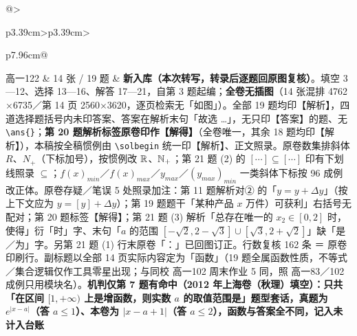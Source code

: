 \documentclass[a4paper,11pt]{article}
\begin{document}
\begin{xltabular}{\textwidth}{@{}>{\raggedright\arraybackslash}p{3.39cm}>{\centering\arraybackslash}p{3.39cm}>{\raggedright\arraybackslash}p{7.96cm}@{}}
高一122 & 14 张 / 19 题 & \textbf{新入库（本次转写，转录后逐题回原图复核）}。填空 3---12、选择 13---16、解答 17---21，自第 3 题起编；\textbf{全卷无插图}（14 张混排 4762$\times$6735／第 14 页 2560$\times$3620，逐页检索无「如图」）。全部 19 题均印【解析】，四道选择题括号内未印答案、答案在解析末句「故选 \ldots」，无只印【答案】的题、无 \texttt{\textbackslash{}ans\{\}}；\textbf{第 20 题解析标签原卷印作【解得】}（全卷唯一，其余 18 题均印【解析】），本稿按全稿惯例由 \texttt{\textbackslash{}solbegin} 统一印【解析】、正文照录。原卷数集排斜体 \(R\)、\(N_+\allowbreak \)（下标加号），按惯例改 \(\mathbb{R}\)、\(\mathbb{N}_+\allowbreak \)；第 21 题 (2) 的 \(\left[\cdots\right]\subseteq\allowbreak \left[\cdots\right]\) 印有下划线照录 \(\subseteq\allowbreak \)；\(f(x)_{min}\)／\(f(x)_{max}\)／\(y_{max}\)／\((y_{max})_{min}\) 一类斜体下标按 96 成例改正体。原卷存疑／笔误 5 处照录加注：第 11 题解析对② 的「\(y=y+\allowbreak \Delta y\)」（按上下文应为 \(y=\allowbreak [y]+\allowbreak \Delta y\)）；第 19 题题干「某种产品 \(x\) 万件）可获利」右括号无配对；第 20 题标签【解得】；第 21 题 (3) 解析「总存在唯一的 \(x_2\in[0,\allowbreak 2]\) 时，使得」衍「时」字、末句「\(a\) 的范围 \([-\sqrt2,\allowbreak 2-\sqrt3]\cup\allowbreak [\sqrt3,\allowbreak 2+\allowbreak \sqrt2]\)」缺「是／为」字。另第 21 题 (1) 行末原卷「：」已回图订正。行数复核 162 条 ＝ 原卷印刷行。副标题以全部 14 页实际内容定为「函数」（19 题全属函数性质，不等式／集合逻辑仅作工具零星出现；与同校 高一102 周末作业 5 同，照 高一83／102 成例只用模块名）。\textbf{机判仅第 7 题有命中（2012 年上海卷（秋理）填空）：只共「在区间 \([1,\allowbreak +\allowbreak \infty)\) 上是增函数，则实数 \(a\) 的取值范围是」题型套话，真题为 \(e^{\lvert x-a\rvert}\)（答 \(a\leqslant\allowbreak 1\)）、本卷为 \(\lvert x-a+\allowbreak 1\rvert\)（答 \(a\leqslant\allowbreak 2\)），函数与答案全不同，记入未计入台账} \\ \addlinespace[1pt]

\end{xltabular}
\end{document}
